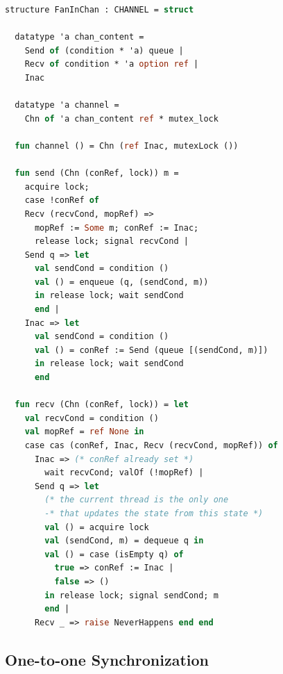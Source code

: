 \documentclass[10pt]{article}
\begin{document}
\begin{lstlisting}[language=ML, mathescape]
  structure FanInChan : CHANNEL = struct

  datatype 'a chan_content =
    Send of (condition * 'a) queue |
    Recv of condition * 'a option ref |
    Inac

  datatype 'a channel =
    Chn of 'a chan_content ref * mutex_lock

  fun channel () = Chn (ref Inac, mutexLock ())

  fun send (Chn (conRef, lock)) m = 
    acquire lock;
    case !conRef of
    Recv (recvCond, mopRef) => 
      mopRef := Some m; conRef := Inac;
      release lock; signal recvCond |
    Send q => let
      val sendCond = condition ()
      val () = enqueue (q, (sendCond, m))
      in release lock; wait sendCond
      end |
    Inac => let
      val sendCond = condition ()
      val () = conRef := Send (queue [(sendCond, m)])
      in release lock; wait sendCond
      end 

  fun recv (Chn (conRef, lock)) = let
    val recvCond = condition () 
    val mopRef = ref None in
    case cas (conRef, Inac, Recv (recvCond, mopRef)) of
      Inac => (* conRef already set *)
        wait recvCond; valOf (!mopRef) |
      Send q => let
        (* the current thread is the only one
        -* that updates the state from this state *)
        val () = acquire lock
        val (sendCond, m) = dequeue q in
        val () = case (isEmpty q) of
          true => conRef := Inac |
          false => ()
        in release lock; signal sendCond; m
        end |
      Recv _ => raise NeverHappens end end

  \end{lstlisting}

\subsection{One-to-one Synchronization}
\end{document}
